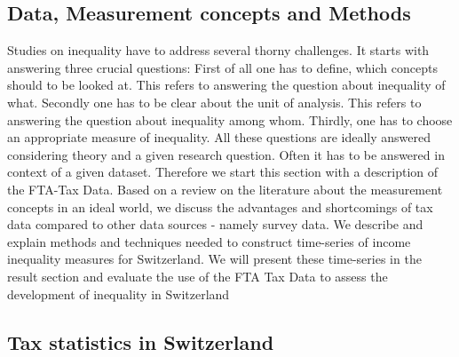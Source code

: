 \documentclass[twoside]{article}\usepackage[]{graphicx}\usepackage[]{color}
\begin{document}
\begin{multicols}{2}







\section{Data, Measurement concepts and Methods}

Studies on inequality have to address several thorny challenges. It starts with answering three crucial questions: First of all one has to define, which concepts should to be looked at. This refers to answering the question about inequality of what. Secondly one has to be clear about the unit of analysis. This refers to answering the question about inequality among whom. Thirdly, one has to choose an appropriate measure of inequality. All these questions are ideally answered considering theory and a given research question. Often it has to be answered in context of a given dataset. Therefore we start this section with a description of the FTA-Tax Data. Based on a review on the literature about the measurement concepts in an ideal world, we discuss the advantages and shortcomings of tax data compared to other data sources - namely survey data. We describe and explain methods and techniques needed to construct time-series of income inequality measures for Switzerland. We will present these time-series in the result section and evaluate the use of the FTA Tax Data to assess the development of inequality in Switzerland

\subsection{Tax statistics in Switzerland}


\end{multicols}
\end{document}
